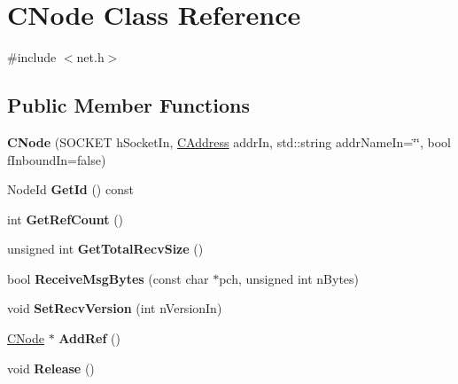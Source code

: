 \hypertarget{class_c_node}{}\section{C\+Node Class Reference}
\label{class_c_node}


{\ttfamily \#include $<$net.\+h$>$}

\subsection*{Public Member Functions}
\begin{DoxyCompactItemize}
\item 
\mbox{\label{class_c_node_a51556705550511146245b9fb2fec09c1}} 
{\bfseries C\+Node} (S\+O\+C\+K\+ET h\+Socket\+In, \mbox{\hyperlink{class_c_address}{C\+Address}} addr\+In, std\+::string addr\+Name\+In=\char`\"{}\char`\"{}, bool f\+Inbound\+In=false)
\item 
\mbox{\label{class_c_node_a157903f7830c0dfbf6a93852066f0b8f}} 
Node\+Id {\bfseries Get\+Id} () const
\item 
\mbox{\label{class_c_node_a72211aaf51af2e981e6b8a1deb73c836}} 
int {\bfseries Get\+Ref\+Count} ()
\item 
\mbox{\label{class_c_node_a2cff79a034258ba032257e993fc42e62}} 
unsigned int {\bfseries Get\+Total\+Recv\+Size} ()
\item 
\mbox{\label{class_c_node_a84a10eb3aec7fdddafeb354527b50b75}} 
bool {\bfseries Receive\+Msg\+Bytes} (const char $\ast$pch, unsigned int n\+Bytes)
\item 
\mbox{\label{class_c_node_a94438c6285d1635c62ccff10593780e6}} 
void {\bfseries Set\+Recv\+Version} (int n\+Version\+In)
\item 
\mbox{\label{class_c_node_afb65ed679f7bda59aab89e0f5afae292}} 
\mbox{\hyperlink{class_c_node}{C\+Node}} $\ast$ {\bfseries Add\+Ref} ()
\item 
\mbox{\label{class_c_node_af804bf7c7f9794e80a3b916e1befece9}} 
void {\bfseries Release} ()
\item 

\end{DoxyCompactItemize}
